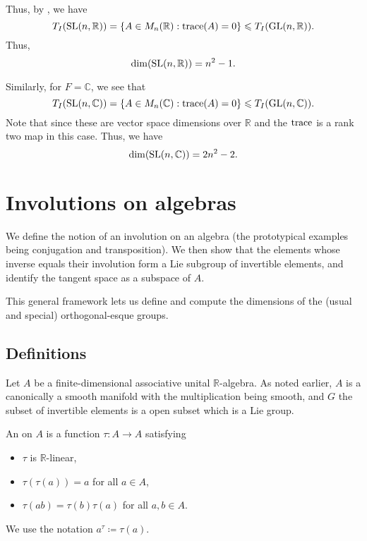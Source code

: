 \documentclass[12pt]{article}
\begin{document}
Thus, by , we have
\begin{equation*} 
	T_{I}(\operatorname{SL}(n, \mathbb{R})) = \{A \in M_{n}(\mathbb{R}) : \operatorname{trace}(A) = 0\} \leqslant T_{I}(\operatorname{GL}(n, \mathbb{R})).
\end{equation*}
Thus,
\begin{equation*} 
	\dim(\operatorname{SL}(n, \mathbb{R})) = n^{2} - 1.
\end{equation*}

Similarly, for $F = \mathbb{C}$, we see that
\begin{equation*} 
	T_{I}(\operatorname{SL}(n, \mathbb{C})) = \{A \in M_{n}(\mathbb{C}) : \operatorname{trace}(A) = 0\} \leqslant T_{I}(\operatorname{GL}(n, \mathbb{C})).
\end{equation*}
Note that since these are vector space dimensions over $\mathbb{R}$ and the $\operatorname{trace}$ is a rank two map in this case. Thus, we have
\begin{equation*} 
	\dim(\operatorname{SL}(n, \mathbb{C})) = 2n^{2} - 2.
\end{equation*}

\section{Involutions on algebras}

We define the notion of an involution on an algebra (the prototypical examples being conjugation and transposition). 
We then show that the elements whose inverse equals their involution form a Lie subgroup of invertible elements, 
and identify the tangent space as a subspace of $A$.

This general framework lets us define and compute the dimensions of the (usual and special) orthogonal-esque groups.

\subsection{Definitions}

Let $A$ be a finite-dimensional associative unital $\mathbb{R}$-algebra. 
As noted earlier, $A$ is a canonically a smooth manifold with the multiplication being smooth, 
and $G$ the subset of invertible elements is a open subset which is a Lie group. 

\begin{defn}
	An  on $A$ is a function $\tau \colon A \to A$ satisfying
	\begin{itemize}
		\item $\tau$ is $\mathbb{R}$-linear,
		\item $\tau(\tau(a)) = a$ for all $a \in A$,
		\item $\tau(ab) = \tau(b) \tau(a)$ for all $a, b \in A$.
	\end{itemize}
\end{defn}
We use the notation $a^{\tau} \coloneqq \tau(a)$.
\end{document}
